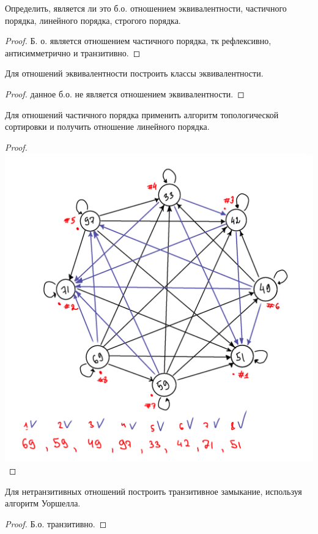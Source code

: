 \begin{problem}
	Определить, является ли это б.о. отношением эквивалентности, частичного порядка, линейного порядка, строгого порядка.
\end{problem}

\begin{proof}
	Б. о. является отношением частичного порядка, тк рефлексивно, антисимметрично и транзитивно.
\end{proof}
\begin{problem}
	Для отношений эквивалентности построить классы эквивалентности.
\end{problem}

\begin{proof}
 данное б.о. не является отношением эквивалентности.
\end{proof}
\begin{problem}
	Для отношений частичного порядка применить алгоритм топологической сортировки и получить отношение линейного порядка.
\end{problem}

\begin{proof}
    \includegraphics{сортировка.png}
\end{proof}
\begin{problem}
	Для нетранзитивных отношений построить транзитивное замыкание, используя алгоритм Уоршелла.
\end{problem}

\begin{proof}
Б.о. транзитивно.
\end{proof}